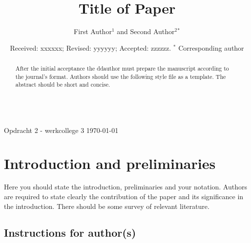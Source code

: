\documentclass[12pt, reqno]{amsart}
\theoremstyle{definition}
\theoremstyle{remark}
\numberwithin{equation}{section}
\begin{document}
\setcounter{page}{1}

    \\
{\small Opdracht 2 - werkcollege 3 \hfill \today}


\centerline{}

\centerline{}

\title[Short Title]{Title of Paper}

\author[F. Author, S. Author]{First Author$^1$ and Second Author$^2$$^{*}$}

\address{$^{1}$ Department of Mathematics, University of Gulf, Dubai, UAE.}
\email{\textcolor[rgb]{0.00,0.00,0.84}{first@gjom.org}}

\address{$^{2}$ Department of Statistics, University of Abu Dhabi, PO Box 881155, Abu Dhabi, UAE}
\email{\textcolor[rgb]{0.00,0.00,0.84}{second@gjom.org}}




\date{Received: xxxxxx; Revised: yyyyyy; Accepted: zzzzzz.
\newline \indent $^{*}$ Corresponding author}

\begin{abstract}
After the initial acceptance the ddauthor must prepare the manuscript according to the journal's format. Authors should use the following style file as a template. The abstract should be short and concise.
\end{abstract} \maketitle

\section{Introduction and preliminaries}

\noindent Here you should state the introduction, preliminaries and
your notation. Authors are required to state clearly the
contribution of the paper and its significance in the introduction.
There should be some survey of relevant literature.

\subsection{Instructions for author(s)}
\end{document}
